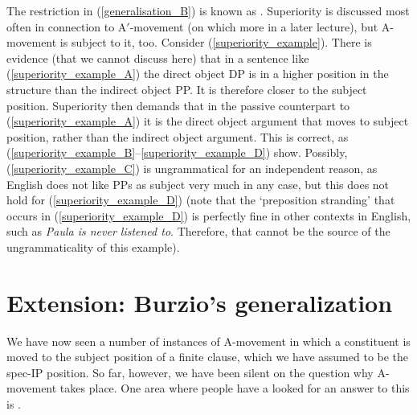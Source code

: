 \documentclass{article}
\begin{document}
The restriction in (\ref{generalisation_B}) is known as .
Superiority is discussed most often in connection to A$'$-movement (on which more in a later lecture), but A-movement is subject to it, too.
Consider (\ref{superiority_example}).
There is evidence (that we cannot discuss here) that in a sentence like (\ref{superiority_example_A}) the direct object DP is in a higher position in the structure than the indirect object PP.
It is therefore closer to the subject position.
Superiority then demands that in the passive counterpart to (\ref{superiority_example_A}) it is the direct object argument that moves to subject position, rather than the indirect object argument.
This is correct, as (\ref{superiority_example_B}--\ref{superiority_example_D}) show.
Possibly, (\ref{superiority_example_C}) is ungrammatical for an independent reason, as English does not like PPs as subject very much in any case, but this does not hold for (\ref{superiority_example_D}) (note that the `preposition stranding' that occurs in (\ref{superiority_example_D}) is perfectly fine in other contexts in English, such as  \emph{Paula is never listened to}.
Therefore, that cannot be the source of the ungrammaticality of this example). 
\begin{exe}
    \label{superiority_example}
\end{exe}

\section{Extension: Burzio’s generalization}

We have now seen a number of instances of A-movement in which a constituent is moved to the subject position of a finite clause, which we have assumed to be the spec-IP position.
So far, however, we have been silent on the question why A-movement takes place.
One area where people have a looked for an answer to this is . 
\end{document}
